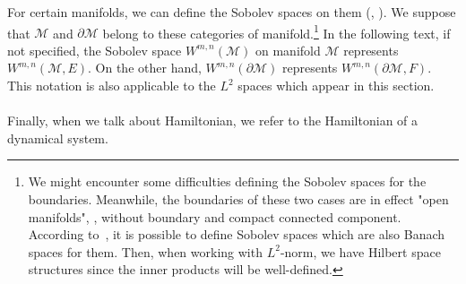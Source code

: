 For certain manifolds, we can define the Sobolev spaces on them (\cite{Hebey1996}, \cite{Eichhorn1996}).
We suppose that $\mathcal{M}$ and $\partial\mathcal{M}$ belong to these categories of manifold.\footnote{
We might encounter some difficulties defining the Sobolev spaces for the boundaries. Meanwhile, the boundaries of these two cases are in effect "open manifolds", \ie, without boundary and compact connected component. 
According to~\cite{Eichhorn1996}, it is possible to define Sobolev spaces which are also Banach spaces for them.
Then, when working with $L^2$-norm, we have Hilbert space structures since the inner products will be well-defined.  
}
In the following text, if not specified, the Sobolev space $W^{m,n}(\mathcal{M})$ on manifold $\mathcal{M}$ represents $W^{m,n}(\mathcal{M}, E)$.
On the other hand, $W^{m,n}(\partial \mathcal{M})$ represents $W^{m,n}(\partial \mathcal{M}, F)$.
This notation is also applicable to the $L^2$ spaces which appear in this section. \\\\
Finally, when we talk about Hamiltonian, we refer to the Hamiltonian of a dynamical system.
%
